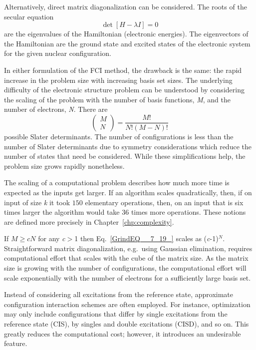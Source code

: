 \documentclass[11pt,oneside,final]{huthesis}%
\begin{document}
 Alternatively, direct matrix diagonalization can be considered.  The roots of the secular equation
\begin{equation*}
\det [H-\lambda I]=0 
\end{equation*} 
are the eigenvalues of the Hamiltonian (electronic energies).  The eigenvectors of the Hamiltonian are the ground state and excited states of the electronic system for the given nuclear configuration.  

In either formulation of the FCI method, the drawback is the same: the rapid increase in the problem size with increasing basis set sizes.  The underlying difficulty of the electronic structure problem can be understood by considering the scaling of the problem with the number of basis functions, \textit{M}, and the number of electrons, \textit{N}.  There are
\begin{equation} \label{GrindEQ__7_19_} 
\left(\begin{array}{l} {M} \\ {N} \end{array}\right)=\frac{M!}{N!(M-N)!} 
\end{equation} 
possible Slater determinants.  The number of configurations is less than the number of Slater determinants due to symmetry considerations which reduce the number of states that need be considered.  While these simplifications help, the problem size grows rapidly nonetheless.

The scaling of a computational problem describes how much more time is expected as the inputs get larger.  If an algorithm scales quadratically, then, if on input of size \textit{k} it took $150$ elementary operations, then, on an input that is six times larger the algorithm would take 36 times more operations.  These notions are defined more precisely in Chapter~\ref{chp:complexity}.

If $M\ge cN$ for any \textit{c}$>$1 then Eq.~\eqref{GrindEQ__7_19_} scales as (\textit{c}-1)\textit{${}^{N}$}.   Straightforward matrix diagonalization, e.g.~using Gaussian elimination, requires computational effort that scales with the cube of the matrix size. As the matrix size is growing with the number of configurations, the computational effort will scale exponentially with the number of electrons for a sufficiently large basis set.

Instead of considering all excitations from the reference state, approximate configuration interaction schemes are often employed.  For instance, optimization may only include configurations that differ by single excitations from the reference state (CIS), by singles and double excitations (CISD), and so on.  This greatly reduces the computational cost; however, it introduces an undesirable feature.  
\end{document}
